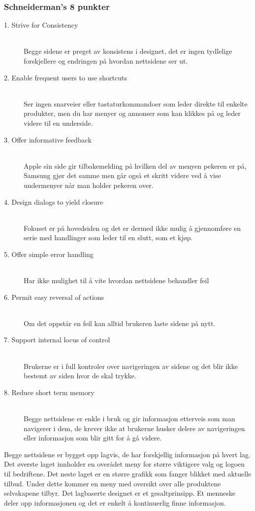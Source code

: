 \documentclass[a4paper, 10pt]{article}
\begin{document}
\subsubsection{Schneiderman's 8 punkter}

\begin{description}
  \item[1. Strive for Consistency] \hfill \\
    Begge sidene er preget av konsistens i designet, det er ingen tydlelige forskjellere og endringen på hvordan nettsidene ser ut.  
  \item[2. Enable frequent users to use shortcuts] \hfill \\
    Ser ingen snarveier eller tastaturkommandoer som leder direkte til enkelte produkter, men du har menyer og annonser som kan klikkes på og leder videre til en underside. 
  \item[3. Offer informative feedback] \hfill \\
    Apple sin side gir tilbakemelding på hvilken del av menyen pekeren er på, Samsung gjør det samme men går også et skritt videre ved å vise undermenyer når man holder pekeren over.  
  \item[4. Design dialogs to yield closure] \hfill \\
    Fokuset er på hovedsiden og det er dermed ikke mulig å gjennomføre en serie med handlinger som leder til en slutt, som et kjøp. 
  \item[5. Offer simple error handling] \hfill \\
    Har ikke mulighet til å vite hvordan nettsidene behandler feil
  \item[6. Permit easy reversal of actions] \hfill \\
    Om det oppstår en feil kan alltid brukeren laste sidene på nytt.  
  \item[7. Support internal locus of control] \hfill \\
    Brukerne er i full kontroler over navigeringen av sidene og det blir ikke bestemt av siden hvor de skal trykke. 
  \item[8. Reduce short term memory] \hfill \\
    Begge nettsidene er enkle i bruk og gir informasjon etterveis som man navigerer i dem, de krever ikke at brukerne husker delere av navigeringen eller informasjon som blir gitt for å gå videre.  
\end{description}

Begge nettsidene er bygget opp lagvis, de har forskjellig informasjon på hvert lag. Det øverste laget innholder en overådet meny for større viktigere valg og logoen til bedriftene. Det neste laget er en større grafikk som fanger blikket med aktuelle tilbud. Under dette kommer en meny med oversikt over alle produktene selvskapene tilbyr. Det lagbaserte designet er et gesaltprinsipp. Et menneske deler opp informasjonen og det er enkelt å kontinuerlig finne informasjon.\\
\end{document}
